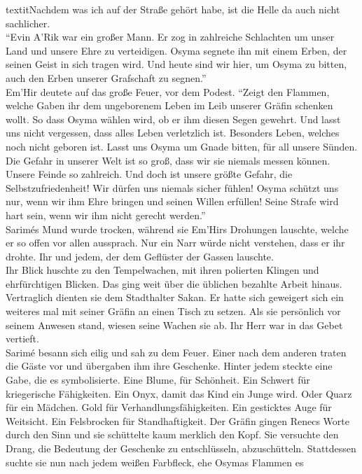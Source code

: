 textit{Nachdem was ich auf der Straße gehört habe, ist die Helle da auch nicht sachlicher.}\\
``Evin A'Rik war ein großer Mann. Er zog in zahlreiche Schlachten um unser Land und unsere Ehre 
zu verteidigen. Osyma segnete ihn mit einem Erben, der seinen Geist in sich tragen wird. Und heute 
sind wir hier, um Osyma zu bitten, auch den Erben unserer Grafschaft zu segnen.''\\
Em'Hir deutete auf das große Feuer, vor dem Podest. ``Zeigt den Flammen, welche Gaben ihr dem 
ungeborenem Leben im Leib unserer Gräfin schenken wollt. So dass Osyma wählen wird, ob er ihm 
diesen Segen gewehrt. Und lasst uns nicht vergessen, dass alles Leben verletzlich ist. Besonders 
Leben, welches noch nicht geboren ist. Lasst uns Osyma um Gnade bitten, für all unsere Sünden. 
Die Gefahr in unserer Welt ist so groß, dass wir sie niemals messen können. Unsere Feinde so 
zahlreich. Und doch ist unsere größte Gefahr, die Selbstzufriedenheit! Wir dürfen uns niemals 
sicher fühlen! Osyma schützt uns nur, wenn wir ihm Ehre bringen und seinen Willen erfüllen! 
Seine Strafe wird hart sein, wenn wir ihm nicht gerecht werden.''\\
Sarimés Mund wurde trocken, während sie Em'Hirs Drohungen lauschte, welche er so offen vor allen 
aussprach. Nur ein Narr würde nicht verstehen, dass er ihr drohte. Ihr und jedem, der dem 
Geflüster der Gassen lauschte. \\
Ihr Blick huschte zu den Tempelwachen, mit ihren polierten Klingen und ehrfürchtigen Blicken. Das 
ging weit über die üblichen bezahlte Arbeit hinaus. Vertraglich dienten sie dem Stadthalter 
Sakan. Er hatte sich geweigert sich ein weiteres mal mit seiner Gräfin an einen Tisch zu 
setzen. Als sie persönlich vor seinem Anwesen stand, wiesen seine Wachen sie ab. Ihr Herr war 
in das Gebet vertieft.\\
Sarimé besann sich eilig und sah zu dem Feuer. Einer nach dem anderen traten die Gäste vor und 
übergaben ihm ihre Geschenke. Hinter jedem steckte eine Gabe, die es symbolisierte. Eine Blume, für 
Schönheit. Ein Schwert für kriegerische Fähigkeiten. Ein Onyx, damit das Kind ein Junge wird. Oder 
Quarz für ein Mädchen. Gold für Verhandlungsfähigkeiten. Ein gesticktes Auge für Weitsicht. Ein 
Felsbrocken für Standhaftigkeit. Der Gräfin gingen Renecs Worte durch den Sinn und sie schüttelte 
kaum merklich den Kopf. Sie versuchte den Drang, die Bedeutung der Geschenke zu entschlüsseln, 
abzuschütteln. Stattdessen suchte sie nun nach jedem weißen Farbfleck, ehe Osymas Flammen es 
